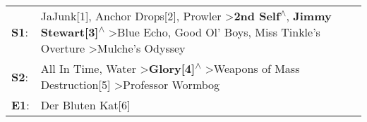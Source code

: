 \begin{supertabular}{p{0.03\textwidth}p{0.92\textwidth}}
 \textbf{S1}:  &  JaJunk[1]\textsuperscript{}, \enspace Anchor Drops[2]\textsuperscript{}, \enspace Prowler\textsuperscript{} \textgreater \enspace \textbf{2nd Self\textsuperscript{$\wedge$}}, \enspace \textbf{Jimmy Stewart[3]\textsuperscript{$\wedge$}} \textgreater \enspace Blue Echo\textsuperscript{}, \enspace Good Ol' Boys\textsuperscript{}, \enspace Miss Tinkle's Overture\textsuperscript{} \textgreater \enspace Mulche's Odyssey\textsuperscript{}  \enspace  \\
 \textbf{S2}:  &                                                                                                                                                                                   All In Time\textsuperscript{}, \enspace Water\textsuperscript{} \textgreater \enspace \textbf{Glory[4]\textsuperscript{$\wedge$}} \textgreater \enspace Weapons of Mass Destruction[5]\textsuperscript{} \textgreater \enspace Professor Wormbog\textsuperscript{}  \enspace  \\
 \textbf{E1}:  &                                                                                                                                                                                                                                                                                                                                                                                                                  Der Bluten Kat[6]\textsuperscript{}  \enspace  \\
\end{supertabular}
